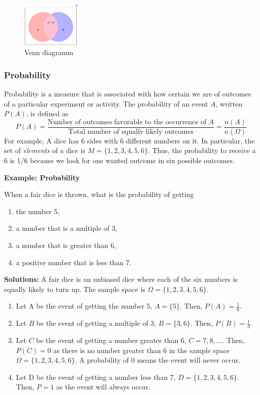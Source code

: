 \documentclass[
  12pt,
  oneside]{book}
\providecommand{\tightlist}{%
  \setlength{\itemsep}{0pt}\setlength{\parskip}{0pt}}
\theoremstyle{definition}
\theoremstyle{definition}
\theoremstyle{definition}
\theoremstyle{definition}
\theoremstyle{remark}
\begin{document}
\begin{figure}
\centering
\includegraphics[width=0.25\textwidth,height=\textheight]{fig/venndia.png}
\caption{\label{fig:venndiagramm} Venn diagramm}
\end{figure}

\hypertarget{probability}{%
\subsubsection{Probability}\label{probability}}

Probability is a measure that is associated with how certain we are of outcomes of a particular experiment or activity. The probability of an event \(A\), written \(P(A)\), is defined as
\[
P(A)=\frac{\text{Number of outcomes favorable to the occurrence of } A}{\text{Total number of equally likely outcomes}}=\frac{n(A)}{n(\Omega)}
\]
For example, A dice has 6 sides with 6 different numbers on it. In particular, the set of \emph{elements} of a dice is \(M=\{1,2,3,4,5,6\}\). Thus, the probability to receive a 6 is 1/6 because we look for one wanted outcome in six possible outcomes.

\textbf{Example: Probability}

When a fair dice is thrown, what is the probability of getting

\begin{enumerate}
\def\labelenumi{\alph{enumi})}
\tightlist
\item
  the number 5,
\item
  a number that is a multiple of 3,
\item
  a number that is greater than 6,
\item
  a positive number that is less than 7.
\end{enumerate}

\textbf{Solutions:} A fair dice is an unbiased dice where each of the six numbers is equally likely to turn up. The sample space is \(\Omega = \{1, 2, 3, 4, 5, 6\}\).

\begin{enumerate}
\def\labelenumi{\alph{enumi})}
\tightlist
\item
  Let A be the event of getting the number 5, \(A=\{5\}\). Then, \(P(A)=\frac{1}{6}\).
\item
  Let \(B\) be the event of getting a multiple of 3, \(B=\{3, 6\}\). Then, \(P(B)=\frac{1}{3}\).
\item
  Let \(C\) be the event of getting a number greater than 6, \(C=7,8,\dots\). Then, \(P(C)=0\) as there is no number greater than 6 in the sample space \(\Omega=\{1,2,3,4,5,6\}\). A probability of 0 means the event will never occur.
\item
  Let D be the event of getting a number less than 7, \(D=\{1,2,3,4,5,6\}\). Then, \(P=1\) as the event will always occur.
\end{enumerate}
\end{document}
